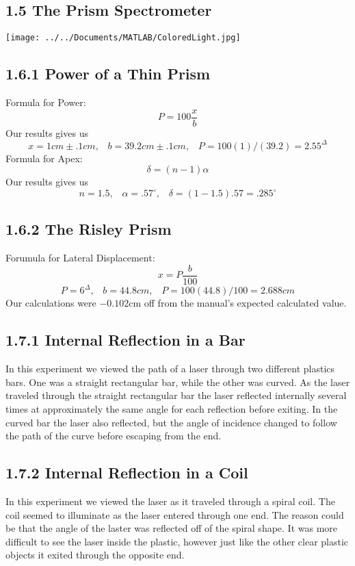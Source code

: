 \documentclass[12pt, oneside]{article}   	%
\begin{document}
\subsection*{1.5 The Prism Spectrometer}

\texttt{[image: ../../Documents/MATLAB/ColoredLight.jpg]} 



\subsection*{1.6.1 Power of a Thin Prism}
Formula for Power:
$$ P = 100\frac{x}{b} $$
Our results gives us
$$ x = 1cm \pm .1cm, \; \; \; b = 39.2cm \pm .1cm, \; \; \; P = 100(1)/(39.2) = 2.55^{\Delta}$$
Formula for Apex:
$$ \delta = (n-1)\alpha$$
Our results gives us
$$ n = 1.5, \; \; \; \alpha= .57^{\circ}, \; \; \; \delta = (1-1.5).57 = .285^{\circ} $$

\subsection*{1.6.2 The Risley Prism}
Forumula for Lateral Displacement:
$$ x = P\frac{b}{100} $$
$$ P = 6^{\Delta}, \; \; \; b = 44.8cm, \; \; \; P = 100(44.8)/100 = 2.688cm$$
Our calculations were $-0.102$cm off from the manual's expected calculated value. 
\subsection*{1.7.1 Internal Reflection in a Bar}
In this experiment we viewed the path of a laser through two different plastics bars.
One was a straight rectangular bar, while the other was curved. 
As the laser traveled through the straight rectangular bar the laser reflected internally several times at approximately the same angle for each reflection before exiting. 
In the curved bar the laser also reflected, but the angle of incidence changed to follow the path of the curve before escaping from the end.
\subsection*{1.7.2 Internal Reflection in a Coil}
In this experiment we viewed the laser as it traveled through a spiral coil.
The coil seemed to illuminate as the laser entered through one end.
The reason could be that the angle of the laster was reflected off of the spiral shape.
It was more difficult to see the laser inside the plastic, however just like the other clear plastic objects it exited through the opposite end.
\end{document}
